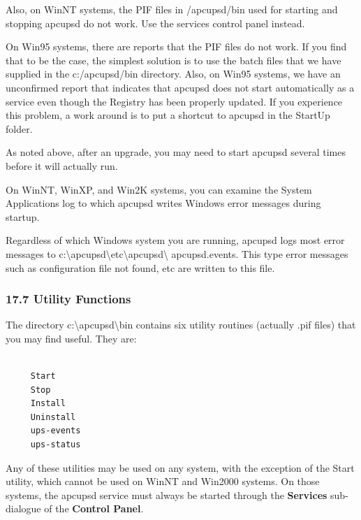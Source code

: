 Also, on WinNT systems, the PIF files in /apcupsd/bin used for starting and
stopping apcupsd do not work. Use the services control panel instead.  

On Win95 systems, there are reports that the PIF files do not work. If you
find that to be the case, the simplest solution is to use the batch files that
we have supplied in the c:/apcupsd/bin directory. Also, on Win95 systems, we
have an unconfirmed report that indicates that apcupsd does not start
automatically as a service even though the Registry has been properly updated.
If you experience this problem, a work around is to put a shortcut to apcupsd
in the StartUp folder.  

As noted above, after an upgrade, you may need to start apcupsd several times
before it will actually run.  

On WinNT, WinXP, and Win2K systems, you can examine the System Applications
log to which apcupsd writes Windows error messages during startup.  

Regardless of which Windows system you are running, apcupsd logs most error
messages to
c:\textbackslash{}apcupsd\textbackslash{}etc\textbackslash{}apcupsd\textbackslash
{}apcupsd.events. This type error messages such as configuration file not
found, etc are written to this file. 

\label{Utility-Functions}

\subsubsection*{17.7 Utility Functions}

The directory c:\textbackslash{}apcupsd\textbackslash{}bin contains six
utility routines (actually .pif files) that you may find useful. They are: 

\footnotesize
\begin{verbatim}
     
     Start
     Stop
     Install
     Uninstall
     ups-events
     ups-status
\end{verbatim}
\normalsize

Any of these utilities may be used on any system, with the exception of the
Start utility, which cannot be used on WinNT and Win2000 systems. On those
systems, the apcupsd service must always be started through the {\bf Services}
sub-dialogue of the {\bf Control Panel}.  

